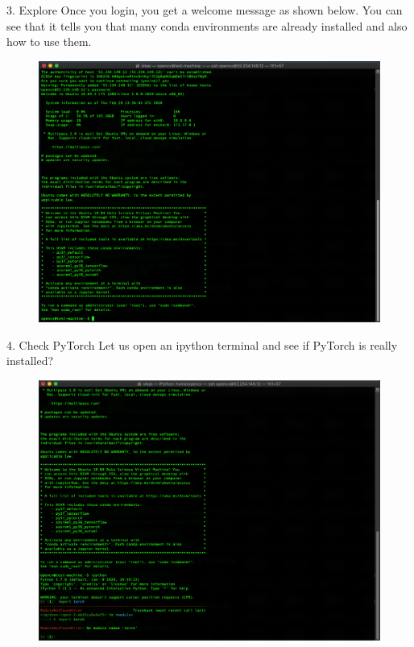 3. Explore
Once you login, you get a welcome message as shown below. You can see that it tells you that many conda environments are already installed and also how to use them.

\begin{figure}[H]
\begin{center} 
\includegraphics[scale=0.40]{figures/ssh7}
\end{center}
\end{figure}

4. Check PyTorch
Let us open an ipython terminal and see if PyTorch is really installed?

\begin{figure}[H]
\begin{center} 
\includegraphics[scale=0.40]{figures/ssh8}
\end{center}
\end{figure}

